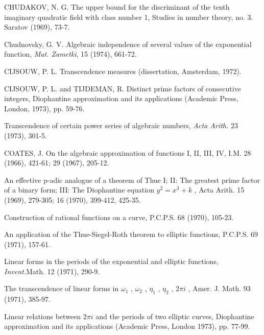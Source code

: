 \begin{hanglist}
    \item CHUDAKOV, N. G. The upper bound for the discriminant of the tenth imaginary quadratic field with class number 1, Studies in number theory, no. 3. Saratov (1969), 73-7.
    \item Chudnovsky, G. V. Algebraic independence of several values of the exponential function, \textit{Mat. Zametki}, 15 (1974), 661-72.
    \item CIJSOUW, P. L. Transcendence measures (dissertation, Amsterdam, 1972).
    \item CIJSOUW, P. L. and TIJDEMAN, R. Distinct prime factors of consecutive integers, Diophantine approximation and its applications (Academic Press, London, 1973), pp. 59-76.
    \item \hspace{1.5em} Transcendence of certain power series of algebraic numbers, \textit{Acta Arith.} 23 (1973), 301-5.
    \item COATES, J. On the algebraic approximation of functions I, II, III, IV, I.M. 28 (1966), 421-61; 29 (1967), 205-12.
    \item \hspace{1.5em} An effective p-adic analogue of a theorem of Thue I; II: The greatest prime factor of a binary form; III: The Diophantine equation  $y^2 = x^3 + k$ , Acta Arith. 15 (1969), 279-305; 16 (1970), 399-412, 425-35.
    \item \hspace{1.5em} Construction of rational functions on a curve, P.C.P.S. 68 (1970), 105-23.
    \item \hspace{1.5em} An application of the Thue-Siegel-Roth theorem to elliptic functions, P.C.P.S. 69 (1971), 157-61.
    \item \hspace{1.5em} Linear forms in the periods of the exponential and elliptic functions, \textit{Invent.}Math. 12 (1971), 290-9.
    \item \hspace{1.5em} The transcendence of linear forms in  $\omega_1$ ,  $\omega_2$ ,  $\eta_1$ ,  $\eta_2$ ,  $2\pi i$ , Amer. J. Math. 93 (1971), 385-97.
    \item \hspace{1.5em} Linear relations between  $2\pi i$  and the periods of two elliptic curves, Diophantine approximation and its applications (Academic Press, London 1973), pp. 77-99.

\end{hanglist}
